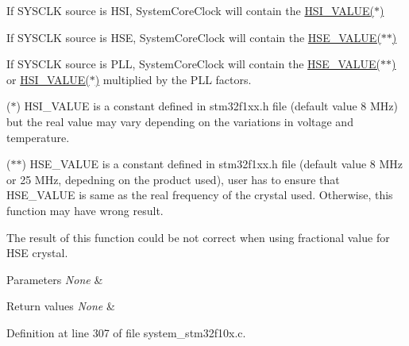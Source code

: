 \begin{DoxyItemize}
\item If S\+Y\+S\+C\+LK source is H\+SI, System\+Core\+Clock will contain the \hyperlink{group___library__configuration__section_gaaa8c76e274d0f6dd2cefb5d0b17fbc37}{H\+S\+I\+\_\+\+V\+A\+L\+U\+E($\ast$)}
\item If S\+Y\+S\+C\+LK source is H\+SE, System\+Core\+Clock will contain the \hyperlink{group___library__configuration__section_gaeafcff4f57440c60e64812dddd13e7cb}{H\+S\+E\+\_\+\+V\+A\+L\+U\+E($\ast$$\ast$)}
\item If S\+Y\+S\+C\+LK source is P\+LL, System\+Core\+Clock will contain the \hyperlink{group___library__configuration__section_gaeafcff4f57440c60e64812dddd13e7cb}{H\+S\+E\+\_\+\+V\+A\+L\+U\+E($\ast$$\ast$)} or \hyperlink{group___library__configuration__section_gaaa8c76e274d0f6dd2cefb5d0b17fbc37}{H\+S\+I\+\_\+\+V\+A\+L\+U\+E($\ast$)} multiplied by the P\+LL factors.
\end{DoxyItemize}

($\ast$) H\+S\+I\+\_\+\+V\+A\+L\+UE is a constant defined in stm32f1xx.\+h file (default value 8 M\+Hz) but the real value may vary depending on the variations in voltage and temperature.

($\ast$$\ast$) H\+S\+E\+\_\+\+V\+A\+L\+UE is a constant defined in stm32f1xx.\+h file (default value 8 M\+Hz or 25 M\+Hz, depedning on the product used), user has to ensure that H\+S\+E\+\_\+\+V\+A\+L\+UE is same as the real frequency of the crystal used. Otherwise, this function may have wrong result.


\begin{DoxyItemize}
\item The result of this function could be not correct when using fractional value for H\+SE crystal. 
\begin{DoxyParams}{Parameters}
{\em None} & \\
\hline
\end{DoxyParams}

\begin{DoxyRetVals}{Return values}
{\em None} & \\
\hline
\end{DoxyRetVals}

\end{DoxyItemize}

Definition at line 307 of file system\+\_\+stm32f10x.\+c.

